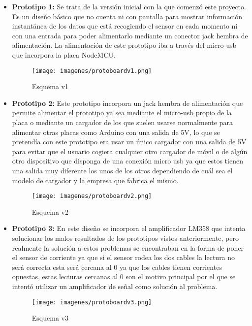 \begin{itemize}
	\item \textbf{Prototipo 1: } Se trata de la versión inicial con la que comenzó este proyecto. Es un diseño básico que no cuenta ni con pantalla para mostrar información instantánea de los datos que está recogiendo el sensor en cada momento ni con una entrada para poder alimentarlo mediante un conector jack hembra de alimentación. La alimentación de este prototipo iba a través del micro-usb que incorpora la placa NodeMCU. 
	
	\begin{figure}[H]
		\centering
		\texttt{[image: imagenes/protoboardv1.png]}
		\caption{Esquema v1}
		\label{fig:protoboardv1}
	\end{figure}

	\item \textbf{Prototipo 2: } Este prototipo incorpora un jack hembra de alimentación que permite alimentar el prototipo ya sea mediante el micro-usb propio de la placa o mediante un cargador de los que suelen usarse normalmente para alimentar otras placas como Arduino con una salida de 5V, lo que se pretendía con este prototipo era usar un único cargador con una salida de 5V para evitar que el usuario cogiera cualquier otro cargador de móvil o de algún otro dispositivo que disponga de una conexión micro usb ya que estos tienen una salida muy diferente los unos de los otros dependiendo de cuál sea el modelo de cargador y la empresa que fabrica el mismo.
	
	\begin{figure}[H]
		\centering
		\texttt{[image: imagenes/protoboardv2.png]}
		\caption{Esquema v2}
		\label{fig:protoboardv2}
	\end{figure}
	
	
	\item \textbf{Prototipo 3: } En este diseño se incorpora el amplificador LM358 \cite{lm358} que intenta solucionar los malos resultados de los prototipos vistos anteriormente, pero realmente la solución a estos problemas se encontraban en la forma de poner el sensor de corriente ya que si el sensor rodea los dos cables la lectura no será correcta esta será cercana al 0 ya que los cables tienen corrientes opuestas, estas lecturas cercanas al 0 son el motivo principal por el que se intentó utilizar un amplificador de señal como solución al problema.
	
	\begin{figure}[H]
		\centering
		\texttt{[image: imagenes/protoboardv3.png]}
		\caption{Esquema v3}
		\label{fig:protoboardv3}
	\end{figure}
	

\end{itemize}
